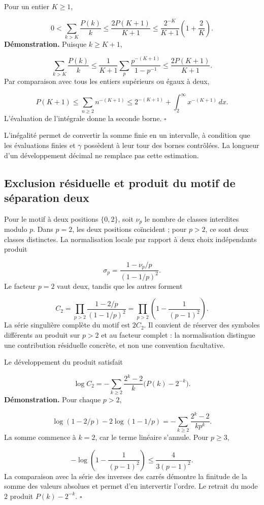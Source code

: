Pour un entier $K\ge1$,

\[
0<\sum_{k>K}\frac{P(k)}k
\le\frac{2P(K+1)}{K+1}
\le\frac{2^{-K}}{K+1}\left(1+\frac2K\right).
\]
\textbf{Démonstration.} Puisque $k\ge K+1$,

\[
\sum_{k>K}\frac{P(k)}k
\le\frac1{K+1}\sum_p\frac{p^{-(K+1)}}{1-p^{-1}}
\le\frac{2P(K+1)}{K+1}.
\]
Par comparaison avec tous les entiers supérieurs ou égaux à deux,

\[
P(K+1)\le\sum_{n\ge2}n^{-(K+1)}
\le2^{-(K+1)}+\int_2^\infty x^{-(K+1)}\,dx.
\]
L'évaluation de l'intégrale donne la seconde borne. \hfill\(\square\)

L'inégalité permet de convertir la somme finie en un intervalle, à condition que les évaluations finies et $\gamma$ possèdent à leur tour des bornes contrôlées. La longueur d'un développement décimal ne remplace pas cette estimation.

\subsection{Exclusion résiduelle et produit du motif de séparation deux}
Pour le motif à deux positions \(\{0,2\}\), soit $\nu_p$ le nombre de classes interdites modulo $p$. Dans $p=2$, les deux positions coïncident ; pour $p>2$, ce sont deux classes distinctes. La normalisation locale par rapport à deux choix indépendants produit

\[
\sigma_p=\frac{1-\nu_p/p}{(1-1/p)^2}.
\]
Le facteur $p=2$ vaut deux, tandis que les autres forment

\[
C_2=\prod_{p>2}\frac{1-2/p}{(1-1/p)^2}
=\prod_{p>2}\left(1-\frac1{(p-1)^2}\right).
\]
La série singulière complète du motif est $2C_2$. Il convient de réserver des symboles différents au produit sur $p>2$ et au facteur complet : la normalisation distingue une contribution résiduelle concrète, et non une convention facultative.

Le développement du produit satisfait

\[
\log C_2=-\sum_{k\ge2}\frac{2^k-2}{k}\bigl(P(k)-2^{-k}\bigr).
\]
\textbf{Démonstration.} Pour chaque $p>2$,

\[
\log(1-2/p)-2\log(1-1/p)
=-\sum_{k\ge2}\frac{2^k-2}{kp^k}.
\]
La somme commence à $k=2$, car le terme linéaire s’annule. Pour \(p\ge3\),

\[
-\log\left(1-\frac1{(p-1)^2}\right)\le\frac4{3(p-1)^2}.
\]
La comparaison avec la série des inverses des carrés démontre la finitude de la somme des valeurs absolues et permet d'en intervertir l'ordre. Le retrait du mode $2$ produit $P(k)-2^{-k}$. \hfill\(\square\)

